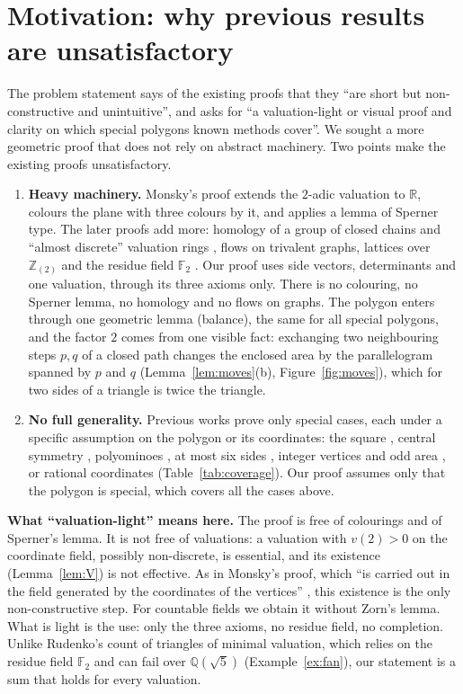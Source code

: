 \documentclass[11pt]{article}
\theoremstyle{definition}
\newcommand{\Q}{\mathbb{Q}}
\newcommand{\Z}{\mathbb{Z}}
\newcommand{\R}{\mathbb{R}}
\newcommand{\F}{\mathbb{F}}
\begin{document}
\section{Motivation: why previous results are unsatisfactory}\label{sec:motivation}

The problem statement says of the existing proofs that they ``are short but non-constructive and
unintuitive'', and asks for ``a valuation-light or visual proof and clarity on which special polygons
known methods cover''. We sought a more geometric proof that does not rely on abstract machinery.
Two points make the existing proofs unsatisfactory.

\begin{enumerate}
\item \textbf{Heavy machinery.} Monsky's proof \cite{Mon70} extends the $2$-adic valuation to $\R$,
colours the plane with three colours by it, and applies a lemma of Sperner type. The later proofs
add more: homology of a group of closed chains and ``almost discrete'' valuation rings
\cite{Mon90}, flows on trivalent graphs, lattices over $\Z_{(2)}$ and the residue field $\F_2$
\cite{Rud}. Our proof uses side vectors, determinants and one valuation, through its three axioms
only. There is no colouring, no Sperner lemma, no homology and no flows on graphs. The polygon enters through
one geometric lemma (balance), the same for all special polygons, and the factor $2$ comes from one
visible fact: exchanging two neighbouring steps $p,q$ of a closed path changes the enclosed area by
the parallelogram spanned by $p$ and $q$ (Lemma~\ref{lem:moves}(b), Figure~\ref{fig:moves}), which
for two sides of a triangle is twice the triangle.
\item \textbf{No full generality.} Previous works prove only special cases, each under a specific
assumption on the polygon or its coordinates: the square \cite{Mon70}, central symmetry \cite{Mon90},
polyominoes \cite{Ste99,Pra}, at most six sides \cite{Ste00}, integer vertices and odd area
\cite{Rud12}, or rational coordinates \cite{Rud} (Table~\ref{tab:coverage}). Our proof assumes only
that the polygon is special, which covers all the cases above.
\end{enumerate}

\textbf{What ``valuation-light'' means here.} The proof is free of colourings and of Sperner's
lemma. It is not free of valuations: a valuation with $v(2)>0$ on the coordinate field, possibly
non-discrete, is essential, and its existence (Lemma~\ref{lem:V}) is not effective. As in Monsky's
proof, which ``is carried out in the field generated by the coordinates of the vertices''
\cite[p.~164]{Mon70}, this existence is the only non-constructive step. For countable fields we
obtain it without Zorn's lemma. What is light is the use: only the three axioms, no residue field,
no completion. Unlike Rudenko's count of triangles of minimal valuation, which relies on the residue
field $\F_2$ and can fail over $\Q(\sqrt5)$ (Example~\ref{ex:fan}), our statement is a sum that holds
for every valuation.
\end{document}
